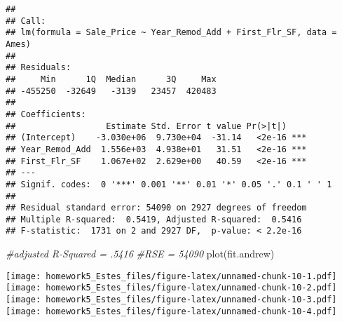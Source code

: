 \documentclass[
]{article}
\newenvironment{Shaded}{\begin{snugshade}}{\end{snugshade}}
\newcommand{\CommentTok}[1]{\textcolor[rgb]{0.56,0.35,0.01}{\textit{#1}}}
\newcommand{\FunctionTok}[1]{\textcolor[rgb]{0.00,0.00,0.00}{#1}}
\newcommand{\NormalTok}[1]{#1}
\begin{document}
\begin{verbatim}
## 
## Call:
## lm(formula = Sale_Price ~ Year_Remod_Add + First_Flr_SF, data = Ames)
## 
## Residuals:
##     Min      1Q  Median      3Q     Max 
## -455250  -32649   -3139   23457  420483 
## 
## Coefficients:
##                  Estimate Std. Error t value Pr(>|t|)    
## (Intercept)    -3.030e+06  9.730e+04  -31.14   <2e-16 ***
## Year_Remod_Add  1.556e+03  4.938e+01   31.51   <2e-16 ***
## First_Flr_SF    1.067e+02  2.629e+00   40.59   <2e-16 ***
## ---
## Signif. codes:  0 '***' 0.001 '**' 0.01 '*' 0.05 '.' 0.1 ' ' 1
## 
## Residual standard error: 54090 on 2927 degrees of freedom
## Multiple R-squared:  0.5419, Adjusted R-squared:  0.5416 
## F-statistic:  1731 on 2 and 2927 DF,  p-value: < 2.2e-16
\end{verbatim}

\begin{Shaded}
\begin{Highlighting}[]
\CommentTok{\#adjusted R{-}Squared = .5416}
\CommentTok{\#RSE = 54090}
\FunctionTok{plot}\NormalTok{(fit.andrew)}
\end{Highlighting}
\end{Shaded}

\texttt{[image: homework5\_Estes\_files/figure-latex/unnamed-chunk-10-1.pdf]}
\texttt{[image: homework5\_Estes\_files/figure-latex/unnamed-chunk-10-2.pdf]}
\texttt{[image: homework5\_Estes\_files/figure-latex/unnamed-chunk-10-3.pdf]}
\texttt{[image: homework5\_Estes\_files/figure-latex/unnamed-chunk-10-4.pdf]}
\end{document}
